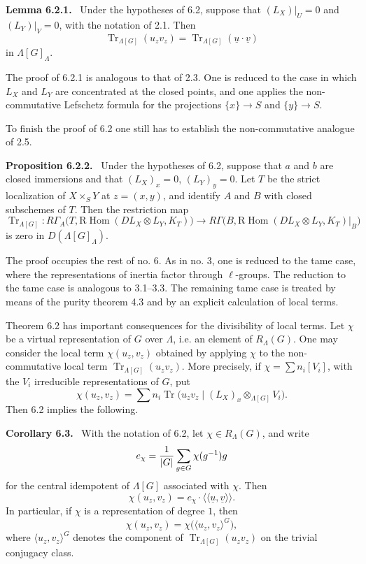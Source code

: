 \documentclass[12pt]{article}
\newcommand{\RHom}{\mathrm R\!\operatorname{Hom}}
\newcommand{\Tr}{\operatorname{Tr}}
\newenvironment{statement}[1]{\par\medskip\noindent\textbf{#1.}\ }{\par\medskip}
\begin{document}
\begin{statement}{Lemma 6.2.1}
Under the hypotheses of 6.2, suppose that $(L_X)|_U=0$ and $(L_Y)|_V=0$, with the
notation of 2.1. Then
\[
       \Tr_{\Lambda[G]}(u_zv_z)=\Tr_{\Lambda[G]}(\underline u\cdot\underline v)
\]
in $\Lambda[G]_{\Lambda}$.
\end{statement}

The proof of 6.2.1 is analogous to that of 2.3. One is reduced to the case in which
$L_X$ and $L_Y$ are concentrated at the closed points, and one applies the
non-commutative Lefschetz formula for the projections
$\{x\}\to S$ and $\{y\}\to S$.

To finish the proof of 6.2 one still has to establish the non-commutative analogue
of 2.5.

\begin{statement}{Proposition 6.2.2}
Under the hypotheses of 6.2, suppose that $a$ and $b$ are closed immersions and that
$(L_X)_x=0$, $(L_Y)_y=0$. Let $T$ be the strict localization of
$X\times_S Y$ at $z=(x,y)$, and identify $A$ and $B$ with closed subschemes of
$T$. Then the restriction map
\[
\Tr_{\Lambda[G]}:
R\Gamma_A\bigl(T,\RHom(DL_X\otimes L_Y,K_T)\bigr)
\longrightarrow
R\Gamma\bigl(B,\RHom(DL_X\otimes L_Y,K_T)|_B\bigr)
\]
is zero in $D(\Lambda[G]_{\Lambda})$.
\end{statement}

The proof occupies the rest of no. 6. As in no. 3, one is reduced to the tame case,
where the representations of inertia factor through $\ell$-groups. The reduction to
the tame case is analogous to 3.1--3.3. The remaining tame case is treated by means
of the purity theorem 4.3 and by an explicit calculation of local terms.

Theorem 6.2 has important consequences for the divisibility of local terms. Let
$\chi$ be a virtual representation of $G$ over $\Lambda$, i.e. an element of
$R_\Lambda(G)$. One may consider the local term $\chi(u_z,v_z)$ obtained by
applying $\chi$ to the non-commutative local term
$\Tr_{\Lambda[G]}(u_zv_z)$. More precisely, if
$\chi=\sum n_i[V_i]$, with the $V_i$ irreducible representations of $G$, put
\[
   \chi(u_z,v_z)=\sum n_i\Tr\bigl(u_zv_z\mid (L_X)_x\otimes_{\Lambda[G]}V_i\bigr).
\]
Then 6.2 implies the following.

\begin{statement}{Corollary 6.3}
With the notation of 6.2, let $\chi\in R_\Lambda(G)$, and write
\[
     e_\chi={1\over |G|}\sum_{g\in G}\chi(g^{-1})g
\]
for the central idempotent of $\Lambda[G]$ associated with $\chi$. Then
\[
     \chi(u_z,v_z)=e_\chi\cdot
       \langle\!\langle \underline u,\underline v\rangle\!\rangle .
\]
In particular, if $\chi$ is a representation of degree $1$, then
\[
     \chi(u_z,v_z)=\chi\bigl(\langle u_z,v_z\rangle^G\bigr),
\]
where $\langle u_z,v_z\rangle^G$ denotes the component of
$\Tr_{\Lambda[G]}(u_zv_z)$ on the trivial conjugacy class.
\end{statement}
\end{document}
